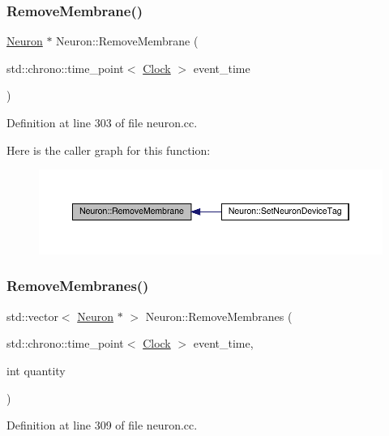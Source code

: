 \subsubsection{\texorpdfstring{Remove\+Membrane()}{RemoveMembrane()}}
{\footnotesize\ttfamily \hyperlink{class_neuron}{Neuron} $\ast$ Neuron\+::\+Remove\+Membrane (\begin{DoxyParamCaption}\item[{std\+::chrono\+::time\+\_\+point$<$ \hyperlink{universe_8h_a0ef8d951d1ca5ab3cfaf7ab4c7a6fd80}{Clock} $>$}]{event\+\_\+time }\end{DoxyParamCaption})}



Definition at line 303 of file neuron.\+cc.

Here is the caller graph for this function\+:
\nopagebreak
\begin{figure}[H]
\begin{center}
\leavevmode
\includegraphics[width=350pt]{class_neuron_a190ae0628482048bef95c8b318939322_icgraph}
\end{center}
\end{figure}
\mbox{\label{class_neuron_a3cd5fc6f1a354d99bb8768df7ee40552}} 
\subsubsection{\texorpdfstring{Remove\+Membranes()}{RemoveMembranes()}}
{\footnotesize\ttfamily std\+::vector$<$ \hyperlink{class_neuron}{Neuron} $\ast$ $>$ Neuron\+::\+Remove\+Membranes (\begin{DoxyParamCaption}\item[{std\+::chrono\+::time\+\_\+point$<$ \hyperlink{universe_8h_a0ef8d951d1ca5ab3cfaf7ab4c7a6fd80}{Clock} $>$}]{event\+\_\+time,  }\item[{int}]{quantity }\end{DoxyParamCaption})}



Definition at line 309 of file neuron.\+cc.

